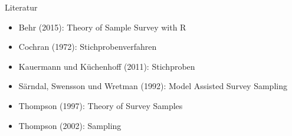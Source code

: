 \documentclass[9pt]{beamer}
\begin{document}
\begin{frame}{Literatur}
  \begin{itemize}
    \item Behr (2015): Theory of Sample Survey with R
    \item Cochran (1972): Stichprobenverfahren
    \item Kauermann und K\"{u}chenhoff (2011): Stichproben
    \item S\"{a}rndal, Swensson und Wretman (1992): Model Assisted Survey Sampling
    \item Thompson (1997): Theory of Survey Samples
    \item Thompson (2002): Sampling
  \end{itemize}
\end{frame}
\end{document}
